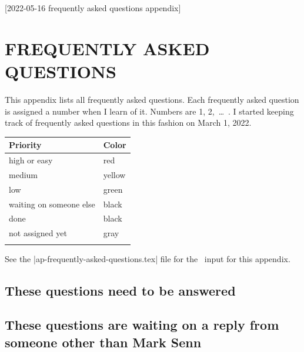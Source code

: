 [2022-05-16 frequently asked questions appendix]

\newcommand{\MyA}{\textbf{A: }}

\makeatletter
\newcommand{\faq}[2]
  {%
    \vspace{6pt}
    \noindent
    {%
      \bfseries
      \ifthen{\equal{high}{#2}}{\color{red}}%
      \ifthen{\equal{medium}{#2}}{\color{yellow}}%
      \ifthen{\equal{low}{#2}}{\color{green}}%
      \ifthen{\equal{done}{#2}}{\color{black}}%
      \ifthen{\equal{fixed}{#2}}{\color{black}}%
      \ifthen{\equal{wait}{#2}}{\color{black}}%
      \ifthen{\equal{not}{#2}}{\color{gray}}%
      {\fontsize{9}{10}\reset@font\bf FAQ}
      #1.
    }%
    \ignorespaces
  }
\makeatother
  
\chapter{FREQUENTLY ASKED QUESTIONS}

This appendix lists all frequently asked questions.
Each frequently asked question is assigned a number when I learn of it.
Numbers are 1, 2,~\ldots~.
I started keeping track
of frequently asked questions
in this fashion
on March 1, 2022.

\begin{tabular}{@{}ll@{}}
  \toprule
  \bf Priority& \bf Color\\
  \midrule
  high or easy& \color{red}red\\
  medium& \color{yellow}yellow\\
  low& \color{green}green\\
  waiting on someone else& \color{black}black\\
  done& \color{black}black\\
  not assigned yet& \color{gray}gray\\
  \bottomrule\\
\end{tabular}

See the
|ap-frequently-asked-questions.tex|
file
for the \LaTeXLogo\ input
for this appendix.


\section{These questions need to be answered}


\section{These questions are waiting on a reply from someone other than Mark Senn}


